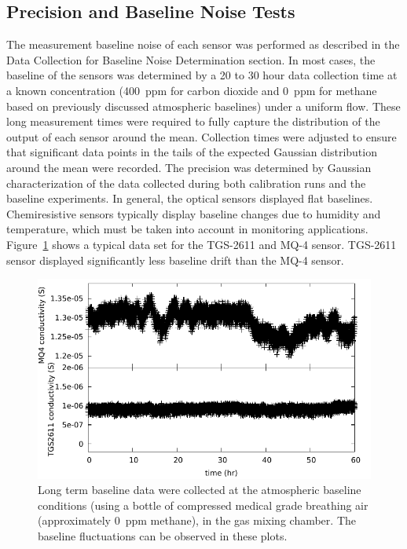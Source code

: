 \documentclass[times]{joehreview}
\begin{document}
	\subsection*{Precision and Baseline Noise Tests}
	\label{sec:main_baseline}
	
	The measurement baseline noise of each sensor was performed as described in the Data Collection for Baseline Noise Determination section.  In most cases, the baseline of the sensors was determined by a 20 to 30 hour data collection time at a known concentration (400~ppm for carbon dioxide and 0~ppm for methane based on previously discussed atmospheric baselines) under a uniform flow.  These long measurement times were required to fully capture the distribution of the output of each sensor around the mean.  Collection times were adjusted to ensure that significant data points in the tails of the expected Gaussian distribution around the mean were recorded.  The precision was determined by Gaussian characterization of the data collected during both calibration runs and the baseline experiments.  In general, the optical sensors displayed flat baselines. Chemiresistive sensors typically display baseline changes due to humidity and temperature, which must be taken into account in monitoring applications. Figure~\ref{fig:MQ4TGSbaseline} shows a typical data set for the TGS-2611 and MQ-4 sensor.  TGS-2611 sensor displayed significantly less baseline drift than the MQ-4 sensor. 
	
	\begin{figure}[!t]
		\centering
		\includegraphics[width=\columnwidth]{honey5.pdf}
		\caption{Long term baseline data were collected at the atmospheric baseline conditions (using a bottle of compressed medical grade breathing air (approximately 0~ppm methane), in the gas mixing chamber.  The baseline fluctuations can be observed in these plots.}
		\label{fig:MQ4TGSbaseline}
	\end{figure}
	
\end{document}
